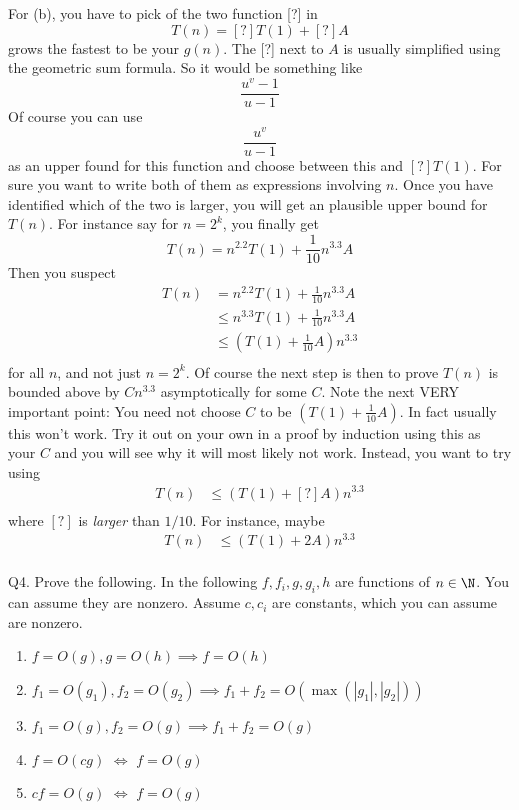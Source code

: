 For (b), you have to pick of the two function [?] in
\[
T(n) = [?] T(1) + [?] A
\]
grows the fastest to be your $g(n)$.
The [?] next to $A$ is usually simplified using the geometric sum
formula. So it would be something like
\[
\frac{u^{v} - 1}{u - 1}
\]
Of course you can use
\[
\frac{u^v}{u - 1}
\]
as an upper found for this function and choose between this and
$[?] T(1)$.
For sure you want to write both of them as expressions involving $n$.
Once you have identified which of the two is larger, you will get
an plausible upper bound for $T(n)$.
For instance say for $n = 2^k$, you finally get
\[
T(n) = n^{2.2} T(1) + \frac{1}{10} n^{3.3} A
\]
Then you suspect
\begin{align*}
  T(n)
  &= n^{2.2} T(1) + \frac{1}{10} n^{3.3} A \\
  &\leq n^{3.3} T(1) + \frac{1}{10} n^{3.3} A \\
  &\leq \left( T(1) + \frac{1}{10} A \right) n^{3.3} \\
\end{align*}
for all $n$, and not just $n = 2^k$.
Of course the next step is then to prove
$T(n)$ is bounded above by $Cn^{3.3}$ asymptotically for some $C$.
Note the next VERY important point:
You need not choose $C$ to be $\left( T(1) + \frac{1}{10} A \right)$.
In fact usually this won't work.
Try it out on your own in a proof by induction using this as your $C$
and you will see why it will most likely not work.
Instead, you want to try using
\begin{align*}
  T(n)
  &\leq \left( T(1) + [?] A \right) n^{3.3} \\
\end{align*}
where $[?]$ is \textit{larger} than $1/10$.
For instance, maybe 
\begin{align*}
  T(n)
  &\leq \left( T(1) + 2 A \right) n^{3.3} \\
\end{align*}


\SOLUTION



\newpage
Q4.
Prove the following.
In the following $f, f_i, g, g_i, h$ are functions of $n \in \N$.
You can assume they are nonzero. 
Assume $c, c_i$ are constants, which you can assume are nonzero.
\begin{enumerate}[label=(\alph*)]
\item
  $f = O(g), g = O(h) \implies f = O(h)$
\item
  $f_1 = O(g_1), f_2 = O(g_2)
  \implies f_1 + f_2 = O ( \max(|g_1|, |g_2|) )$
\item
  $f_1 = O(g), f_2 = O(g) \implies f_1 + f_2 = O (g)$
\item
  $f = O(cg)$ $\iff$ $f = O(g)$
\item
  $cf = O(g)$ $\iff$ $f = O(g)$
\end{enumerate}

